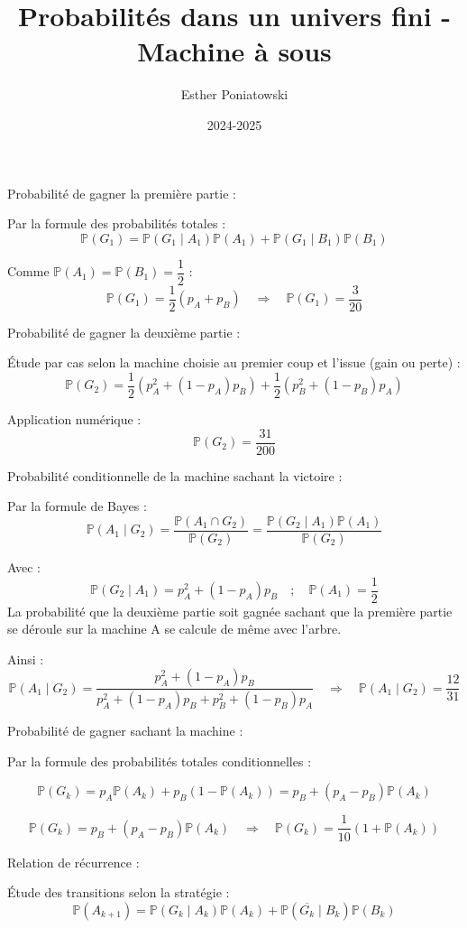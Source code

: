 \documentclass[10pt,a4paper]{article}
\title{Probabilités dans un univers fini - Machine à sous}
\author{Esther Poniatowski}
\date{2024-2025}
\begin{document}
\q Probabilité de gagner la première partie :

Par la formule des probabilités totales :
\[
\mathbb{P}(G_1) = \mathbb{P}(G_1 \mid A_1) \mathbb{P}(A_1) + \mathbb{P}(G_1 \mid B_1) \mathbb{P}(B_1)
\]

Comme \( \mathbb{P}(A_1) = \mathbb{P}(B_1) = \dfrac{1}{2} \) :
\[
\boxed{\mathbb{P}(G_1) = \dfrac{1}{2}(p_A + p_B)}
\quad \Rightarrow \quad \boxed{\mathbb{P}(G_1) = \dfrac{3}{20}}
\]


\q Probabilité de gagner la deuxième partie :

Étude par cas selon la machine choisie au premier coup et l'issue (gain ou perte) :
\[
\mathbb{P}(G_2) = \dfrac{1}{2} \left( p_A^2 + (1 - p_A)p_B \right) + \dfrac{1}{2} \left( p_B^2 + (1 - p_B)p_A \right)
\]

Application numérique :
\[
\boxed{\mathbb{P}(G_2) = \dfrac{31}{200}}
\]


\q Probabilité conditionnelle de la machine sachant la victoire :

Par la formule de Bayes :
\[
\mathbb{P}(A_1 \mid G_2) = \frac{\mathbb{P}(A_1\cap G_2)}{\mathbb{P}(G_2)} = \dfrac{\mathbb{P}(G_2 \mid A_1) \mathbb{P}(A_1)}{\mathbb{P}(G_2)}
\]

Avec :
\[
\mathbb{P}(G_2 \mid A_1) = p_A^2 + (1 - p_A)p_B
\quad ; \quad
\mathbb{P}(A_1) = \dfrac{1}{2}
\]
La probabilité que la deuxième partie soit gagnée sachant que la première partie se déroule sur la
machine A se calcule de même avec l'arbre.

Ainsi :
\[
\boxed{\mathbb{P}(A_1 \mid G_2) = \dfrac{p_A^2 + (1 - p_A)p_B}{p_A^2 + (1 - p_A)p_B + p_B^2 + (1 - p_B)p_A}}
\quad \Rightarrow \quad \boxed{\mathbb{P}(A_1 \mid G_2) = \dfrac{12}{31}}
\]


\q Probabilité de gagner sachant la machine :

Par la formule des probabilités totales conditionnelles :

\[
\mathbb{P}(G_k) = p_A \mathbb{P}(A_k) + p_B (1 - \mathbb{P}(A_k))
= p_B + (p_A - p_B) \mathbb{P}(A_k)
\]

\[
\boxed{\mathbb{P}(G_k) = p_B + (p_A - p_B) \mathbb{P}(A_k)}
\quad \Rightarrow \quad
\boxed{\mathbb{P}(G_k) = \dfrac{1}{10}(1 + \mathbb{P}(A_k))}
\]


\q Relation de récurrence :

Étude des transitions selon la stratégie :
\[
\mathbb{P}(A_{k+1}) = \mathbb{P}(G_k \mid A_k)\mathbb{P}(A_k) + \mathbb{P}(\overline{G_k} \mid B_k) \mathbb{P}(B_k)
\]
\end{document}
